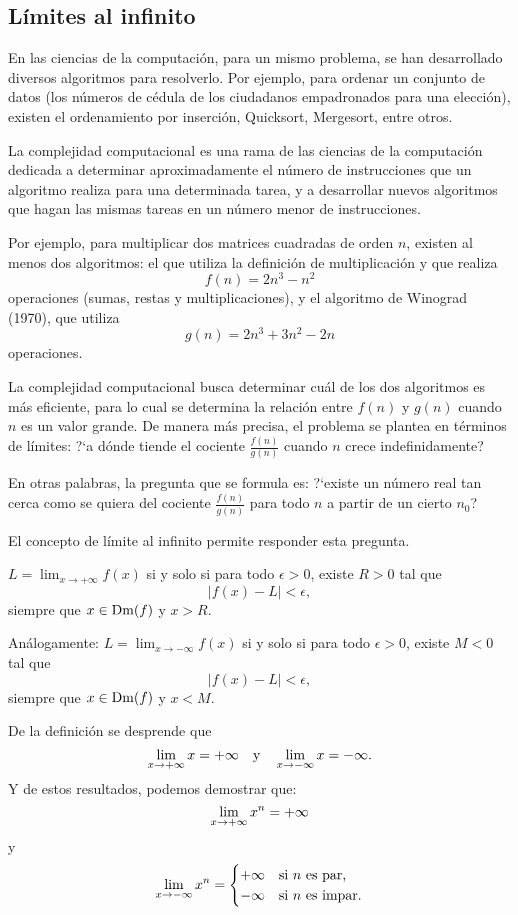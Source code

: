 \subsection{Límites al infinito}
En las ciencias de la computación, para un mismo problema, se han desarrollado diversos algoritmos
para resolverlo. Por ejemplo, para ordenar un conjunto de datos (los números de cédula de los
ciudadanos empadronados para una elección), existen el ordenamiento por inserción, Quicksort,
Mergesort, entre otros.

La complejidad computacional es una rama de las ciencias de la computación dedicada a determinar
aproximadamente el número de instrucciones que un algoritmo realiza para una determinada tarea, y a
desarrollar nuevos algoritmos que hagan las mismas tareas en un número menor de instrucciones.

Por ejemplo, para multiplicar dos matrices cuadradas de orden $n$, existen al menos dos algoritmos:
el que utiliza la definición de multiplicación y que realiza
\[
  f(n) = 2n^3 - n^2
\]
operaciones (sumas, restas y multiplicaciones), y el algoritmo de Winograd (1970), que utiliza
\[
  g(n) = 2n^3 + 3n^2 - 2n
\]
operaciones.

La complejidad computacional busca determinar cuál de los dos algoritmos es más eficiente, para lo
cual se determina la relación entre $f(n)$ y $g(n)$ cuando $n$ es un valor grande. De manera más
precisa, el problema se plantea en términos de límites: ?`a dónde tiende el cociente $\displaystyle
\frac{f(n)}{g(n)}
$
cuando $n$ crece indefinidamente?

En otras palabras, la pregunta que se formula es: ?`existe un número real tan cerca como se quiera
del cociente $\displaystyle\frac{f(n)}{g(n)}$ para todo $n$ a partir de un cierto $n_0$?

El concepto de límite al infinito permite responder esta pregunta.

\begin{defical}
$\displaystyle L=\lim_{x \to +\infty}f(x)$ si y solo si para todo $\epsilon > 0$, existe $R > 0$
tal que
\[
|f(x) - L| < \epsilon,
\]
siempre que $x\in\Dm(f)$ y $x > R$.

Análogamente: $\displaystyle L=\lim_{x \to -\infty}f(x)$ si y solo si para todo $\epsilon > 0$,
existe $M < 0$ tal que
\[
|f(x) - L| < \epsilon,
\]
siempre que $x\in\Dm(f)$ y $x < M$.
\end{defical}

De la definición se desprende que
\[
\limjc{x}{x}{+\infty} = +\infty \yjc \limjc{x}{x}{-\infty} = -\infty.
\]
Y de estos resultados, podemos demostrar que:
\[
\limjc{x^n}{x}{+\infty} = +\infty
\]
y
\[
\limjc{x^n}{x}{-\infty} =
\begin{cases}
+\infty & \text{si $n$ es par,} \\
-\infty & \text{si $n$ es impar}.
\end{cases}
\]

